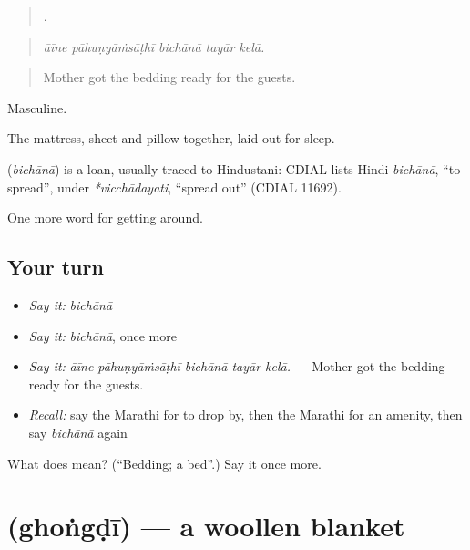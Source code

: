 \begin{quote}
    .
\end{quote}

\begin{quote}
\emph{āīne pāhuṇyāṁsāṭhī bichānā tayār kelā.}
\end{quote}

\begin{quote}
Mother got the bedding ready for the guests.
\end{quote}

Masculine.

The mattress, sheet and pillow together, laid out for sleep.

\begin{cousinweb}
\textbf{} (\emph{bichānā}) is a loan, usually traced to Hindustani: CDIAL lists Hindi \emph{bichānā}, \textquotedblleft{}to spread\textquotedblright{}, under \emph{*vicchādayati}, \textquotedblleft{}spread out\textquotedblright{} (CDIAL 11692).
\end{cousinweb}

\begin{grammarlens}[title={What you've built}]
One more word for getting around.
\end{grammarlens}

\subsection*{Your turn}
\begin{itemize}
\raggedright
  \item \emph{Say it:} \emph{bichānā}
  \item \emph{Say it:} \emph{bichānā}, once more
  \item \emph{Say it:} \emph{āīne pāhuṇyāṁsāṭhī bichānā tayār kelā.} — Mother got the bedding ready for the guests.
  \item \emph{Recall:} say the Marathi for to drop by, then the Marathi for an amenity, then say \emph{bichānā} again
\end{itemize}

\begin{tcolorbox}[breakable,colback=teal!4,colframe=teal!35!black,title={Before you move on}]
What does  mean? (\textquotedblleft{}Bedding; a bed\textquotedblright{}.) Say it once more.
\end{tcolorbox}
\section[\texorpdfstring{\mr{घोंगडी} (ghoṅgḍī)}{घोंगडी (ghoṅgḍī)}]{ (ghoṅgḍī) — a woollen blanket}

